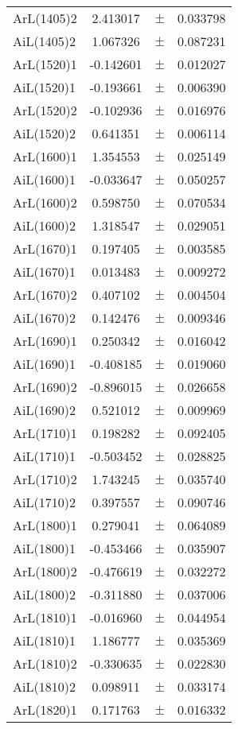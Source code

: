 \begin{table}
\begin{tiny}
\begin{tabular}{lccc}
ArL(1405)2 & 2.413017 & $\pm$ & 0.033798 \\
AiL(1405)2 & 1.067326 & $\pm$ & 0.087231 \\
ArL(1520)1 & -0.142601 & $\pm$ & 0.012027 \\
AiL(1520)1 & -0.193661 & $\pm$ & 0.006390 \\
ArL(1520)2 & -0.102936 & $\pm$ & 0.016976 \\
AiL(1520)2 & 0.641351 & $\pm$ & 0.006114 \\
ArL(1600)1 & 1.354553 & $\pm$ & 0.025149 \\
AiL(1600)1 & -0.033647 & $\pm$ & 0.050257 \\
ArL(1600)2 & 0.598750 & $\pm$ & 0.070534 \\
AiL(1600)2 & 1.318547 & $\pm$ & 0.029051 \\
ArL(1670)1 & 0.197405 & $\pm$ & 0.003585 \\
AiL(1670)1 & 0.013483 & $\pm$ & 0.009272 \\
ArL(1670)2 & 0.407102 & $\pm$ & 0.004504 \\
AiL(1670)2 & 0.142476 & $\pm$ & 0.009346 \\
ArL(1690)1 & 0.250342 & $\pm$ & 0.016042 \\
AiL(1690)1 & -0.408185 & $\pm$ & 0.019060 \\
ArL(1690)2 & -0.896015 & $\pm$ & 0.026658 \\
AiL(1690)2 & 0.521012 & $\pm$ & 0.009969 \\
ArL(1710)1 & 0.198282 & $\pm$ & 0.092405 \\
AiL(1710)1 & -0.503452 & $\pm$ & 0.028825 \\
ArL(1710)2 & 1.743245 & $\pm$ & 0.035740 \\
AiL(1710)2 & 0.397557 & $\pm$ & 0.090746 \\
ArL(1800)1 & 0.279041 & $\pm$ & 0.064089 \\
AiL(1800)1 & -0.453466 & $\pm$ & 0.035907 \\
ArL(1800)2 & -0.476619 & $\pm$ & 0.032272 \\
AiL(1800)2 & -0.311880 & $\pm$ & 0.037006 \\
ArL(1810)1 & -0.016960 & $\pm$ & 0.044954 \\
AiL(1810)1 & 1.186777 & $\pm$ & 0.035369 \\
ArL(1810)2 & -0.330635 & $\pm$ & 0.022830 \\
AiL(1810)2 & 0.098911 & $\pm$ & 0.033174 \\
ArL(1820)1 & 0.171763 & $\pm$ & 0.016332 \\

\end{tabular}
\end{tiny}
\end{table}
